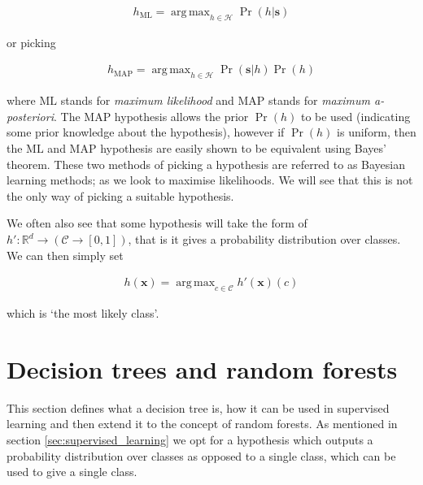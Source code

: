 \documentclass[12pt,twoside,notitlepage]{report}
\newcommand{\vc}[1]{\mathbf{#1}}
\newcommand{\cl}[1]{\mathcal{#1}}
\newcommand{\bb}[1]{\mathbb{#1}}
\DeclareMathOperator*{\argmax}{arg\,max}
\newcommand{\ML}{\text{ML}}
\newcommand{\MAP}{\text{MAP}}
\begin{document}
        \begin{align}
            h_{\ML} = \argmax_{h\in\cl{H}} \Pr(h | \vc{s})
            \label{eq:max_likelihood}
        \end{align}

        or picking

        \begin{align}
            h_{\MAP} = \argmax_{h\in\cl{H}} \Pr(\vc{s} | h) \Pr(h)
            \label{eq:max_a_posteriori}
        \end{align} 

        where $\ML$ stands for \textit{maximum likelihood} and $\MAP$ stands for \textit{maximum a-posteriori}. The $\MAP$ 
        hypothesis allows the prior $\Pr(h)$ to be used (indicating some prior knowledge about the hypothesis), however 
        if $\Pr(h)$ is uniform, then the $\ML$ and $\MAP$ hypothesis are easily shown to be equivalent using Bayes' theorem. 
        These two methods of picking a hypothesis are referred to as Bayesian learning methods; as we look to maximise 
        likelihoods. We will see that this is not the only way of picking a suitable hypothesis. \cite{russell1995modern}

        We often also see that some hypothesis will take the form of $h':\bb{R}^d \rightarrow (\cl{C} \rightarrow [0,1])$, 
        that is it gives a probability distribution over classes. We can then simply set 
        
        \begin{align}
            h(\vc{x}) = \argmax_{c\in\cl{C}} h'(\vc{x})(c)
            \label{eq:weird_hyp}
        \end{align}

        which is `the most likely class'.

        



    \section{Decision trees and random forests} \label{sec:rand_forest}
        This section defines what a decision tree is, how it can be used in supervised learning and then extend it to 
        the concept of random forests. As mentioned in section \ref{sec:supervised_learning} we opt for a hypothesis 
        which outputs a probability distribution over classes as opposed to a single class, which 
        can be used to give a single class.
\end{document}
